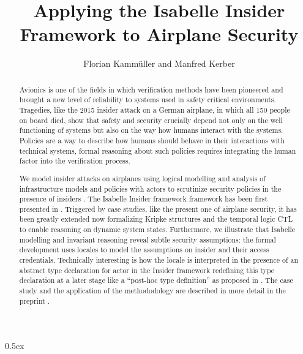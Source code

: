 \documentclass[11pt,a4paper]{article}
\begin{document}
\title{Applying the Isabelle Insider Framework to Airplane Security}
\author{Florian Kamm\"uller and Manfred Kerber}

\maketitle

\begin{abstract}
Avionics is one of the fields in which verification methods have been pioneered 
and brought a new level of reliability to systems used in safety critical 
environments. Tragedies, like the 2015 insider attack on a German airplane, 
in which all 150 people on board died, show that safety and security crucially 
depend not only on the well functioning of systems but also on the way how 
humans interact with the systems. Policies are a way to describe how humans 
should behave in their interactions with technical systems, formal reasoning 
about such policies requires integrating the human factor into the 
verification process.

We model insider attacks on airplanes 
using logical modelling and analysis of infrastructure models 
and policies with actors to scrutinize security policies in the presence of 
insiders \cite{kk:16}. 
The Isabelle Insider framework framework has been first 
presented in \cite{kp:16}. 
Triggered by case studies, like the present one of airplane security, it 
has been greatly extended now formalizing Kripke structures and the temporal 
logic CTL to enable reasoning on dynamic system states. 
Furthermore, we illustrate that Isabelle modelling and invariant 
reasoning reveal subtle security assumptions: the formal development uses
locales to model the assumptions on insider and their access credentials.
Technically interesting is how the locale is interpreted in the presence
of an abstract type declaration for actor in the Insider framework redefining 
this type declaration at a later stage like a ``post-hoc type definition'' 
as proposed in \cite{mw:09}.
The case study and the application of the methododology are described in more 
detail in the preprint \cite{kk:20}.
\end{abstract}

\tableofcontents

\parindent 0pt\parskip 0.5ex





\end{document}
